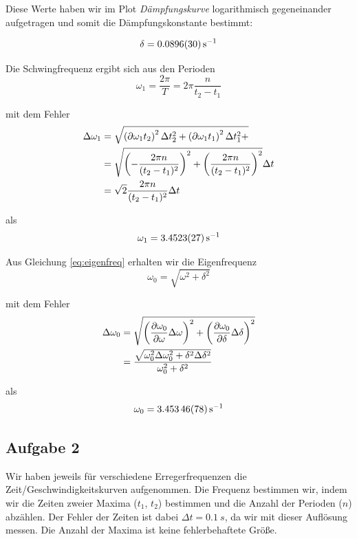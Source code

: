 \documentclass[a4paper,german,12pt,smallheadings]{scrartcl}
\begin{document}
\vspace{1cm}

Diese Werte haben wir im Plot \textit{Dämpfungskurve} logarithmisch
gegeneinander aufgetragen und somit die Dämpfungskonstante bestimmt:

\begin{equation}
  \delta = \SI{0.0896+-0.0030}{s^{-1}}
\end{equation}

Die Schwingfrequenz ergibt sich aus den Perioden
\begin{equation}
  \omega_1 = \frac{2 \pi}{T} = 2 \pi \frac{n}{t_2 - t_1}
\end{equation}

mit dem Fehler
\begin{align}
  \Delta \omega_1 &= \sqrt{
    \del{\partial{\omega_1}{t_2}}^2 \Delta t_2^2 +
    \del{\partial{\omega_1}{t_1}}^2 \Delta t_1^2 +
  } \\
  &= \sqrt{
    \del{-\frac{2 \pi n}{(t_2 - t_1)^2}}^2 +
    \del{\frac{2 \pi n}{(t_2 - t_1)^2}}^2
  } \Delta t \\
  &= \sqrt{2} \frac{2 \pi n}{(t_2 - t_1)^2} \Delta t
\end{align}

als
\begin{equation}
  \omega_1 = \SI{3.4523+-0.0027}{s^{-1}}
\end{equation}

Aus Gleichung \ref{eq:eigenfreq} erhalten wir die Eigenfrequenz
\begin{equation}
  \omega_0 = \sqrt{\omega^2  + \delta^2}
\end{equation}

mit dem Fehler
\begin{align}
  \Delta \omega_0 &= \sqrt{
  \del{\frac{\partial \omega_0}{\partial \omega} \Delta \omega}^2+
  \del{\frac{\partial \omega_0}{\partial \delta} \Delta \delta}^2
} \\
&= \frac{\sqrt{\omega_0^2 \Delta \omega_0^2 + \delta^2 \Delta \delta^2}}{\omega_0^2 + \delta^2}
\end{align}

als
\begin{equation}
  \omega_0 = \SI{3.45346+-0.00078}{s^{-1}}
\end{equation}


\subsection{Aufgabe 2}
Wir haben jeweils für verschiedene Erregerfrequenzen die
Zeit/Geschwindigkeitskurven aufgenommen. Die Frequenz bestimmen wir, indem wir
die Zeiten zweier Maxima ($t_1$, $t_2$) bestimmen und die Anzahl der Perioden
($n$) abzählen. Der Fehler der Zeiten ist dabei $\Delta t = \SI{0.1}{s}$, da
wir mit dieser Auflösung messen. Die Anzahl der Maxima ist keine
fehlerbehaftete Größe.
\end{document}
